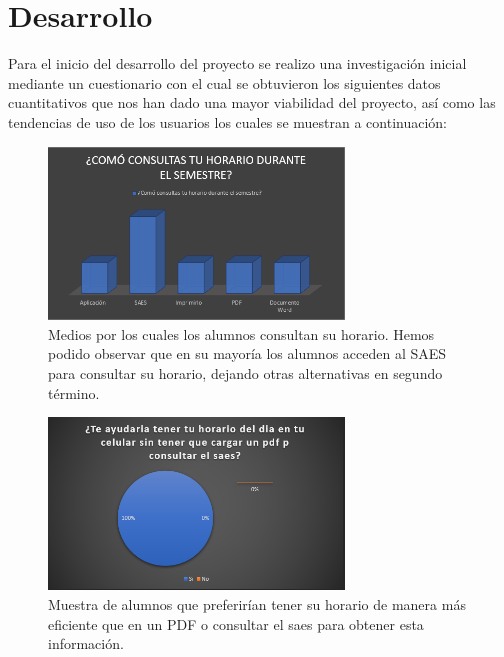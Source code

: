 \documentclass[10pt]{article}
\begin{document}
\section{Desarrollo}
\justify
Para el inicio del desarrollo del proyecto  se realizo una investigación inicial mediante un cuestionario con el cual se obtuvieron los siguientes datos cuantitativos que nos han dado una mayor viabilidad del proyecto, así como las tendencias de uso de los usuarios los cuales se muestran a continuación:

\begin{figure}[H]
    \begin{center}
    \includegraphics[width=0.7\textwidth]{Imagenes/2.PNG}
    \caption{Medios por los cuales los alumnos consultan su horario. Hemos podido observar que en su mayoría los alumnos acceden al SAES para consultar su horario, dejando otras alternativas en segundo término.}
\label{fig1}
    \end{center}
\end{figure} 
\par\vspace{\baselineskip}
\begin{figure}[H]
    \begin{center}
    \includegraphics[width=0.7\textwidth]{Imagenes/3.PNG}
    \caption{Muestra de alumnos que preferirían tener su horario de manera más eficiente que en un PDF o consultar el saes para obtener esta información.}
\label{fig1}
    \end{center}
\end{figure} 
\end{document}
